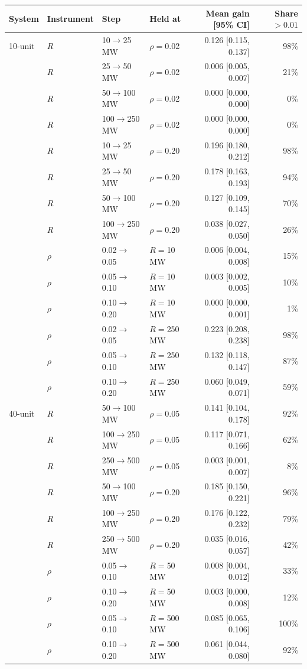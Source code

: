 \begin{tabular}{@{}llllrr@{}}
\toprule
System & Instrument & Step & Held at & Mean gain [95\% CI] & Share $>0.01$ \\
\midrule
10-unit & $R$ & 10$\to$25 MW & $\rho=$0.02 & 0.126 [0.115, 0.137] & 98\% \\
 & $R$ & 25$\to$50 MW & $\rho=$0.02 & 0.006 [0.005, 0.007] & 21\% \\
 & $R$ & 50$\to$100 MW & $\rho=$0.02 & 0.000 [0.000, 0.000] & 0\% \\
 & $R$ & 100$\to$250 MW & $\rho=$0.02 & 0.000 [0.000, 0.000] & 0\% \\
 & $R$ & 10$\to$25 MW & $\rho=$0.20 & 0.196 [0.180, 0.212] & 98\% \\
 & $R$ & 25$\to$50 MW & $\rho=$0.20 & 0.178 [0.163, 0.193] & 94\% \\
 & $R$ & 50$\to$100 MW & $\rho=$0.20 & 0.127 [0.109, 0.145] & 70\% \\
 & $R$ & 100$\to$250 MW & $\rho=$0.20 & 0.038 [0.027, 0.050] & 26\% \\
 & $\rho$ & 0.02$\to$0.05 & $R=$10 MW & 0.006 [0.004, 0.008] & 15\% \\
 & $\rho$ & 0.05$\to$0.10 & $R=$10 MW & 0.003 [0.002, 0.005] & 10\% \\
 & $\rho$ & 0.10$\to$0.20 & $R=$10 MW & 0.000 [0.000, 0.001] & 1\% \\
 & $\rho$ & 0.02$\to$0.05 & $R=$250 MW & 0.223 [0.208, 0.238] & 98\% \\
 & $\rho$ & 0.05$\to$0.10 & $R=$250 MW & 0.132 [0.118, 0.147] & 87\% \\
 & $\rho$ & 0.10$\to$0.20 & $R=$250 MW & 0.060 [0.049, 0.071] & 59\% \\
\midrule
40-unit & $R$ & 50$\to$100 MW & $\rho=$0.05 & 0.141 [0.104, 0.178] & 92\% \\
 & $R$ & 100$\to$250 MW & $\rho=$0.05 & 0.117 [0.071, 0.166] & 62\% \\
 & $R$ & 250$\to$500 MW & $\rho=$0.05 & 0.003 [0.001, 0.007] & 8\% \\
 & $R$ & 50$\to$100 MW & $\rho=$0.20 & 0.185 [0.150, 0.221] & 96\% \\
 & $R$ & 100$\to$250 MW & $\rho=$0.20 & 0.176 [0.122, 0.232] & 79\% \\
 & $R$ & 250$\to$500 MW & $\rho=$0.20 & 0.035 [0.016, 0.057] & 42\% \\
 & $\rho$ & 0.05$\to$0.10 & $R=$50 MW & 0.008 [0.004, 0.012] & 33\% \\
 & $\rho$ & 0.10$\to$0.20 & $R=$50 MW & 0.003 [0.000, 0.008] & 12\% \\
 & $\rho$ & 0.05$\to$0.10 & $R=$500 MW & 0.085 [0.065, 0.106] & 100\% \\
 & $\rho$ & 0.10$\to$0.20 & $R=$500 MW & 0.061 [0.044, 0.080] & 92\% \\
\bottomrule
\end{tabular}
